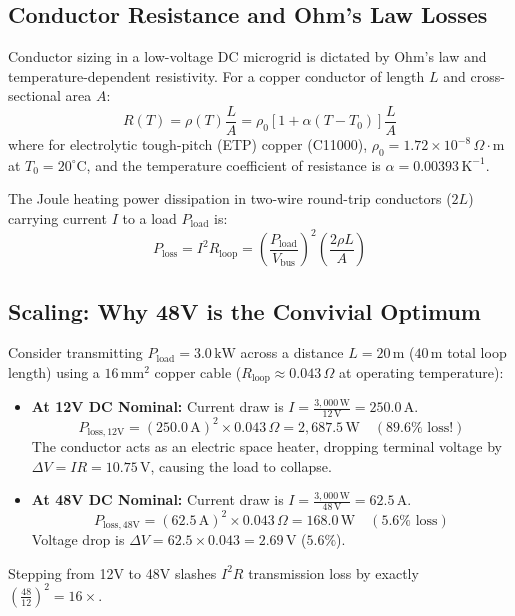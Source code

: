 \subsection{Conductor Resistance and Ohm's Law Losses}
Conductor sizing in a low-voltage DC microgrid is dictated by Ohm's law and temperature-dependent resistivity. For a copper conductor of length $L$ and cross-sectional area $A$:
\begin{equation}
R(T) = \rho(T) \frac{L}{A} = \rho_0 \left[ 1 + \alpha (T - T_0) \right] \frac{L}{A}
\label{eq:conductor_resistance}
\end{equation}
where for electrolytic tough-pitch (ETP) copper (C11000), $\rho_0 = 1.72 \times 10^{-8}\,\Omega\cdot\mathrm{m}$ at $T_0 = 20^\circ\mathrm{C}$, and the temperature coefficient of resistance is $\alpha = 0.00393\,\mathrm{K^{-1}}$.

The Joule heating power dissipation in two-wire round-trip conductors ($2L$) carrying current $I$ to a load $P_{\mathrm{load}}$ is:
\begin{equation}
P_{\mathrm{loss}} = I^2 R_{\mathrm{loop}} = \left( \frac{P_{\mathrm{load}}}{V_{\mathrm{bus}}} \right)^2 \left( \frac{2 \rho L}{A} \right)
\label{eq:joule_loss_power}
\end{equation}

\subsection{Scaling: Why 48V is the Convivial Optimum}
Consider transmitting $P_{\mathrm{load}} = 3.0\,\mathrm{kW}$ across a distance $L = 20\,\mathrm{m}$ ($40\,\mathrm{m}$ total loop length) using a $16\,\mathrm{mm^2}$ copper cable ($R_{\mathrm{loop}} \approx 0.043\,\Omega$ at operating temperature):
\begin{itemize}
    \item \textbf{At 12V DC Nominal:} Current draw is $I = \frac{3,000\,\mathrm{W}}{12\,\mathrm{V}} = 250.0\,\mathrm{A}$.
    \begin{equation}
    P_{\mathrm{loss, 12V}} = (250.0\,\mathrm{A})^2 \times 0.043\,\Omega = 2,687.5\,\mathrm{W} \quad (89.6\%\text{ loss!})
    \label{eq:12v_loss_calc}
    \end{equation}
    The conductor acts as an electric space heater, dropping terminal voltage by $\Delta V = I R = 10.75\,\mathrm{V}$, causing the load to collapse.
    \item \textbf{At 48V DC Nominal:} Current draw is $I = \frac{3,000\,\mathrm{W}}{48\,\mathrm{V}} = 62.5\,\mathrm{A}$.
    \begin{equation}
    P_{\mathrm{loss, 48V}} = (62.5\,\mathrm{A})^2 \times 0.043\,\Omega = 168.0\,\mathrm{W} \quad (5.6\%\text{ loss})
    \label{eq:48v_loss_calc}
    \end{equation}
    Voltage drop is $\Delta V = 62.5 \times 0.043 = 2.69\,\mathrm{V}$ ($5.6\%$).
\end{itemize}
Stepping from 12V to 48V slashes $I^2 R$ transmission loss by exactly $\left(\frac{48}{12}\right)^2 = 16\times$.

